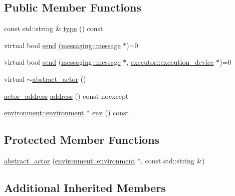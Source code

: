 \subsection*{Public Member Functions}
\begin{DoxyCompactItemize}
\item 
const std\+::string \& \hyperlink{classactor__zeta_1_1actor_1_1abstract__actor_abebf7096ab054eb2be64151f589d70d7}{type} () const
\item 
virtual bool \hyperlink{classactor__zeta_1_1actor_1_1abstract__actor_a9316a5088e53255d74ade831e1fcfb47}{send} (\hyperlink{classactor__zeta_1_1messaging_1_1message}{messaging\+::message} $\ast$)=0
\item 
virtual bool \hyperlink{classactor__zeta_1_1actor_1_1abstract__actor_a929d99bea25095035695bad6e6516575}{send} (\hyperlink{classactor__zeta_1_1messaging_1_1message}{messaging\+::message} $\ast$, \hyperlink{structactor__zeta_1_1executor_1_1execution__device}{executor\+::execution\+\_\+device} $\ast$)=0
\item 
virtual \hyperlink{classactor__zeta_1_1actor_1_1abstract__actor_a12ab33a0d9267d3cf76bf3b2d5879c10}{$\sim$abstract\+\_\+actor} ()
\item 
\hyperlink{classactor__zeta_1_1actor_1_1actor__address}{actor\+\_\+address} \hyperlink{classactor__zeta_1_1actor_1_1abstract__actor_ae6b1f90ca34706d86d39b77c9cdd5a6f}{address} () const noexcept
\item 
\hyperlink{classactor__zeta_1_1environment_1_1environment}{environment\+::environment} $\ast$ \hyperlink{classactor__zeta_1_1actor_1_1abstract__actor_a4486fb3a9d042b2ec94aa1843db278d1}{env} () const
\end{DoxyCompactItemize}
\subsection*{Protected Member Functions}
\begin{DoxyCompactItemize}
\item 
\hyperlink{classactor__zeta_1_1actor_1_1abstract__actor_a65e0e2a223dc06413795f84747bd06b7}{abstract\+\_\+actor} (\hyperlink{classactor__zeta_1_1environment_1_1environment}{environment\+::environment} $\ast$, const std\+::string \&)
\end{DoxyCompactItemize}
\subsection*{Additional Inherited Members}


